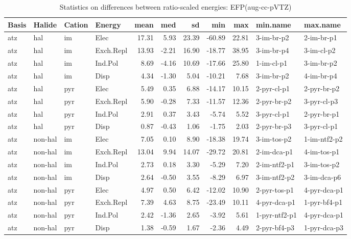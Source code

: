 \documentclass[a4paper]{article}
\begin{document}
\begin{table}[ht]
\centering
\begin{tabular}{llllrrrrrll}
  \hline
Basis & Halide & Cation & Energy & mean & med & sd & min & max & min.name & max.name \\ 
  \hline
atz & hal & im & Elec & 17.31 & 5.93 & 23.39 & -60.89 & 22.81 & 3-im-br-p2 & 2-im-br-p1 \\ 
  atz & hal & im & Exch.Repl & 13.93 & -2.21 & 16.90 & -18.77 & 38.95 & 3-im-br-p4 & 3-im-cl-p2 \\ 
  atz & hal & im & Ind.Pol & 8.69 & -4.16 & 10.69 & -17.66 & 25.80 & 1-im-cl-p1 & 3-im-br-p2 \\ 
  atz & hal & im & Disp & 4.34 & -1.30 & 5.04 & -10.21 & 7.68 & 3-im-br-p2 & 4-im-br-p4 \\ 
  atz & hal & pyr & Elec & 5.49 & 0.35 & 6.88 & -14.17 & 10.15 & 2-pyr-cl-p1 & 2-pyr-br-p2 \\ 
  atz & hal & pyr & Exch.Repl & 5.90 & -0.28 & 7.33 & -11.57 & 12.36 & 2-pyr-br-p2 & 3-pyr-cl-p3 \\ 
  atz & hal & pyr & Ind.Pol & 2.91 & 0.37 & 3.43 & -5.74 & 5.52 & 3-pyr-cl-p1 & 2-pyr-br-p1 \\ 
  atz & hal & pyr & Disp & 0.87 & -0.43 & 1.06 & -1.75 & 2.03 & 2-pyr-br-p3 & 3-pyr-cl-p1 \\ 
  atz & non-hal & im & Elec & 7.05 & 0.10 & 8.90 & -18.38 & 19.74 & 3-im-tos-p2 & 1-im-ntf2-p2 \\ 
  atz & non-hal & im & Exch.Repl & 13.04 & 9.94 & 14.07 & -29.72 & 20.81 & 2-im-dca-p1 & 4-im-tos-p1 \\ 
  atz & non-hal & im & Ind.Pol & 2.73 & 0.18 & 3.30 & -5.29 & 7.20 & 2-im-ntf2-p1 & 3-im-tos-p2 \\ 
  atz & non-hal & im & Disp & 2.64 & -0.50 & 3.55 & -8.29 & 6.97 & 3-im-ntf2-p2 & 3-im-dca-p6 \\ 
  atz & non-hal & pyr & Elec & 4.97 & 0.50 & 6.42 & -12.02 & 10.90 & 2-pyr-tos-p1 & 4-pyr-dca-p1 \\ 
  atz & non-hal & pyr & Exch.Repl & 7.39 & 4.63 & 8.75 & -23.49 & 10.11 & 4-pyr-dca-p1 & 1-pyr-bf4-p1 \\ 
  atz & non-hal & pyr & Ind.Pol & 2.42 & -1.36 & 2.65 & -3.92 & 5.61 & 1-pyr-ntf2-p1 & 4-pyr-dca-p1 \\ 
  atz & non-hal & pyr & Disp & 1.38 & -0.59 & 1.67 & -2.36 & 4.49 & 2-pyr-bf4-p3 & 1-pyr-dca-p3 \\ 
   \hline
\end{tabular}
\caption{Statistics on differences between ratio-scaled energies: EFP(aug-cc-pVTZ)}
\end{table}
\end{document}

